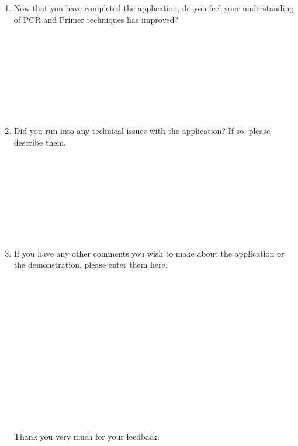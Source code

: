 \documentclass[A4paper]{article}
\begin{document}
\begin{enumerate}
\item Now that you have completed the application, do you feel your understanding of PCR and Primer techniques has improved?\\ \\ \\ \\ \\ \\ \\ \\ \\
\item Did you run into any technical issues with the application? If so, please describe them.\\ \\ \\ \\ \\ \\ \\ \\ \\
\item If you have any other comments you wish to make about the application or the demonstration, please enter them here.\\ \\ \\ \\ \\ \\ \\ \\ \\ \\ \\ \\ \\ \\ \\ 

Thank you very much for your feedback.
\end{enumerate}
\end{document}
